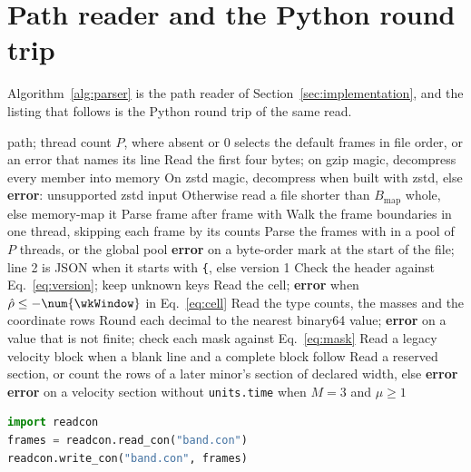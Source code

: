 \section{Path reader and the Python round trip}\label{sec:supp-parser}
Algorithm~\ref{alg:parser} is the path reader of Section~\ref{sec:implementation}, and the listing that follows is the Python round trip of the same read.
\begin{algorithm}[tbp] \footnotesize \caption{Read a CON file from a
path.}
\label{alg:parser} \begin{algorithmic}[1] \Require path; thread count
\(P\), where absent or 0 selects the default \Ensure frames in file
order, or an error that names its line \State Read the first four bytes;
on gzip magic, decompress every member into memory \State On zstd magic,
decompress when built with zstd, else \textbf{error}: unsupported zstd
input \State Otherwise read a file shorter than \(B_{\mathrm{map}}\)
whole, else memory-map it  \State
Parse frame after frame with  \Else \State Walk the
frame boundaries in one thread, skipping each frame by its counts \State
Parse the frames with  in a pool of \(P\) threads, or
the global pool \EndIf {} \State \textbf{error} on
a byte-order mark at the start of the file; line 2 is JSON when it
starts with \texttt{\{}, else version 1 \State Check the header against
Eq.~\eqref{eq:version}; keep unknown keys \State Read the cell;
\textbf{error} when \(\hat\rho\le-\num{\wkWindow}\) in
Eq.~\eqref{eq:cell} \State Read the type counts, the masses and the
coordinate rows \State Round each decimal to the nearest binary64 value;
\textbf{error} on a value that is not finite; check each mask against
Eq.~\eqref{eq:mask}  \State Read
a legacy velocity block when a blank line and a complete block follow
\Else {} \State Read a
reserved section, or count the rows of a later minor's section of
declared width, else \textbf{error} \EndFor \EndIf \State \textbf{error}
on a velocity section without \texttt{units.time} when \(M=3\) and
\(\mu\ge 1\) \EndFunction \end{algorithmic} \end{algorithm}

\begin{lstlisting}[language=Python,caption={\textbf{A checkpoint round trip in Python.} The default printer keeps every binary64 value; six decimals are a separate argument.},label={lst:py}]
import readcon
frames = readcon.read_con("band.con")
readcon.write_con("band.con", frames)
\end{lstlisting}


